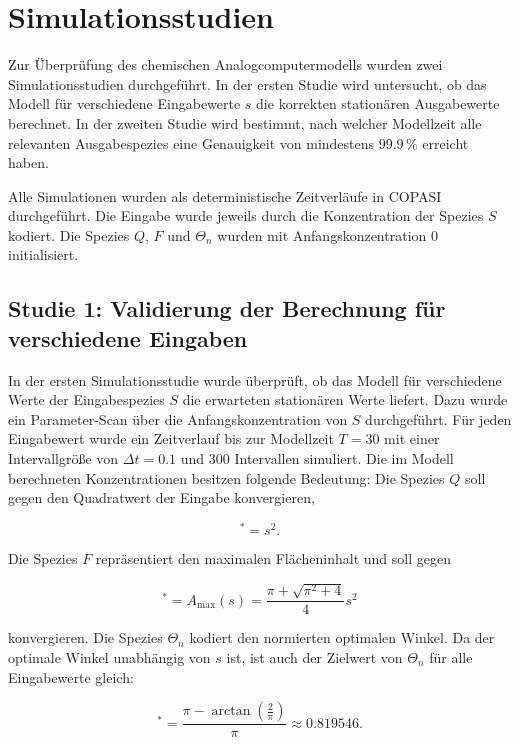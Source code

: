 \section{Simulationsstudien}

Zur Überprüfung des chemischen Analogcomputermodells wurden zwei
Simulationsstudien durchgeführt. In der ersten Studie wird untersucht, ob
das Modell für verschiedene Eingabewerte \(s\) die korrekten stationären
Ausgabewerte berechnet. In der zweiten Studie wird bestimmt, nach welcher
Modellzeit alle relevanten Ausgabespezies eine Genauigkeit von mindestens
\(99.9\,\%\) erreicht haben.

Alle Simulationen wurden als deterministische Zeitverläufe in COPASI
durchgeführt. Die Eingabe wurde jeweils durch die Konzentration der
Spezies \(S\) kodiert. Die Spezies \(Q\), \(F\) und \(\Theta_n\) wurden mit
Anfangskonzentration \(0\) initialisiert.

\subsection{Studie 1: Validierung der Berechnung für verschiedene Eingaben}

In der ersten Simulationsstudie wurde überprüft, ob das Modell für verschiedene Werte der Eingabespezies \(S\) die erwarteten stationären Werte liefert. Dazu wurde ein Parameter-Scan über die Anfangskonzentration von \(S\) durchgeführt. Für jeden Eingabewert wurde ein Zeitverlauf bis zur Modellzeit $T=30$ mit einer Intervallgröße von $\Delta t = 0.1$ und $300$ Intervallen simuliert. Die im Modell berechneten Konzentrationen besitzen folgende Bedeutung: Die Spezies \(Q\) soll gegen den Quadratwert der Eingabe konvergieren,

\begin{equation}
    [Q]^* = s^2.
\end{equation}

Die Spezies \(F\) repräsentiert den maximalen Flächeninhalt und soll gegen

\begin{equation}
    [F]^*
    =
    A_{\max}(s)
    =
    \frac{\pi+\sqrt{\pi^2+4}}{4}s^2
\end{equation}

konvergieren. Die Spezies \(\Theta_n\) kodiert den normierten optimalen
Winkel. Da der optimale Winkel unabhängig von \(s\) ist, ist auch der
Zielwert von \(\Theta_n\) für alle Eingabewerte gleich:

\begin{equation}
    [\Theta_n]^*
    =
    \frac{
        \pi-\arctan\left(\frac{2}{\pi}\right)
    }{\pi}
    \approx
    0.819546.
\end{equation}

